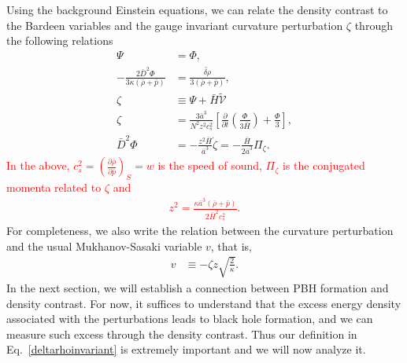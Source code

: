 \documentclass[a4paper,11pt]{article}
\newcommand{\dpar}[1]{\left(#1 \right)}
\begin{document}
Using the background Einstein equations, we can relate the density contrast to the
Bardeen variables and the gauge invariant curvature perturbation $\zeta$ through the
following relations~\cite{Mukhanov1992, Vitenti2013}
\begin{align}
	\Psi                                                    & =\Phi,
	\\
	\label{deltarho}
	-\frac{2\bar{D}^2 \Phi}{3  \kappa (\bar{\rho}+\bar{p})} & =   \frac{{\tilde{\delta\rho}}} {3(\bar{\rho}+\bar{p})}
	,
	\\
	\label{vrelation}
	\zeta                                                   & \equiv \Psi  + \bar{H} \tilde{\mathcal{V}}
	\\
	\label{zeta2}
	\zeta                                                   & = \frac{3  \bar{a}^3}{N^2z^2 c_s^2 } \left[\frac{\partial}{\partial t}\left(\frac{\Phi }{3\bar{H}}\right) + \frac{\Phi}{3}\right]
	,                                                                                                                                                                                           \\
	\label{phiz}
	\bar{D}^{2} \Phi                                        & =  - \frac{z^2\bar{H}}{\bar{a}^3} \dot{\zeta} = -\frac{\bar{H}}{2\bar{a}^3} \Pi_\zeta
	.\end{align}
\textcolor{red}{In the above, $c^{2}_s=\dpar{ \frac{\partial\bar{\rho}}{\partial\bar{p}} }_{S}= w$ is the speed of sound, $\Pi_\zeta$ is the conjugated momenta related to $\zeta$ and
	\begin{align}
		\label{zdef}
		z^2=\frac{\kappa \bar{a}^3 (\bar{\rho} + \bar{p})}{2\bar{H}^2 c_{s}^2}
		.\end{align}}
For completeness, we also write the relation between the curvature perturbation and the
usual Mukhanov-Sasaki variable $v$, that is,
\begin{align}
	\label{msv}
	v & \equiv - \zeta z \sqrt{\frac{2}{\kappa}}
	.\end{align}
In the next section, we will establish a connection between PBH formation and density contrast. For now, it suffices to understand that the excess energy density associated with the perturbations leads to black hole formation, and we can measure such excess through the density contrast. Thus our definition in Eq.~\eqref{deltarhoinvariant} is extremely important and we will now analyze it.
\end{document}
